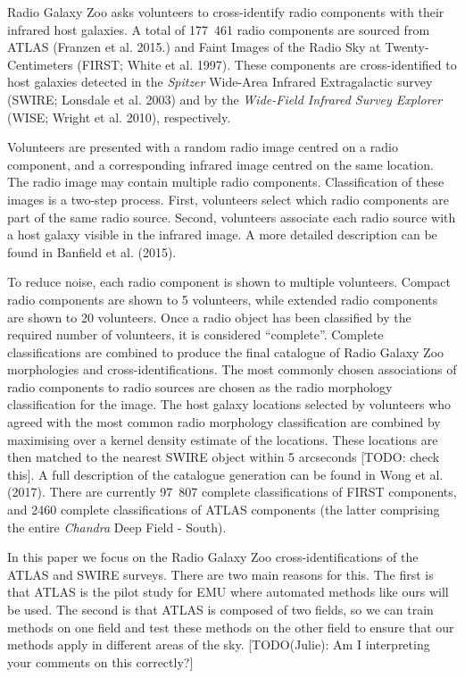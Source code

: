 \documentclass[fleqn,usenatbib,usedcolumn]{mnras}
\begin{document}
    Radio Galaxy Zoo asks volunteers to cross-identify radio components with
    their infrared host galaxies. A total of 177~461 radio components are
    sourced from ATLAS (Franzen et al. 2015.) and Faint Images of the Radio
    Sky at Twenty-Centimeters (FIRST; White et al. 1997). These components
    are cross-identified to host galaxies detected in the \emph{Spitzer}
    Wide-Area Infrared Extragalactic survey (SWIRE; Lonsdale et al. 2003)
    and by the \emph{Wide-Field Infrared Survey Explorer} (WISE; Wright et
    al. 2010), respectively.

    Volunteers are presented with a random radio image centred on a radio
    component, and a corresponding infrared image centred on the same
    location. The radio image may contain multiple radio components.
    Classification of these images is a two-step process. First, volunteers
    select which radio components are part of the same radio source. Second,
    volunteers associate each radio source with a host galaxy visible in the
    infrared image. A more detailed description can be found in Banfield et
    al. (2015).

    To reduce noise, each radio component is shown to multiple volunteers.
    Compact radio components are shown to 5 volunteers, while extended radio
    components are shown to 20 volunteers. Once a radio object has been
    classified by the required number of volunteers, it is considered
    ``complete''. Complete classifications are combined to produce the final
    catalogue of Radio Galaxy Zoo morphologies and cross-identifications.
    The most commonly chosen associations of radio components to radio
    sources are chosen as the radio morphology classification for the image.
    The host galaxy locations selected by volunteers who agreed with the
    most common radio morphology classification are combined by maximising
    over a kernel density estimate of the locations. These locations are
    then matched to the nearest SWIRE object within 5 arcseconds {[}TODO:
    check this{]}. A full description of the catalogue generation can be
    found in Wong et al. (2017). There are currently 97~807 complete
    classifications of FIRST components, and 2460 complete classifications
    of ATLAS components (the latter comprising the entire \emph{Chandra}
    Deep Field - South).

    In this paper we focus on the Radio Galaxy Zoo cross-identifications of
    the ATLAS and SWIRE surveys. There are two main reasons for this. The
    first is that ATLAS is the pilot study for EMU where automated methods
    like ours will be used. The second is that ATLAS is composed of two
    fields, so we can train methods on one field and test these methods on
    the other field to ensure that our methods apply in different areas of
    the sky. {[}TODO(Julie): Am I interpreting your comments on this
    correctly?{]}
\end{document}
